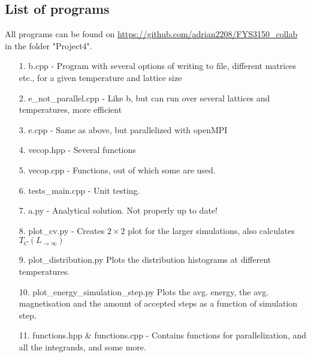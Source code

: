 \documentclass[10pt,a4paper]{article}
\begin{document}
\subsection{List of programs}
All programs can be found on \url{https://github.com/adrian2208/FYS3150_collab} in the folder "Project4".


\begin{itemize}
\item[1.] b.cpp - Program with several options of writing to file, different matrices etc., for a given temperature and lattice size
\item[2.] e\_not\_parallel.cpp - Like b, but can run over several lattices and temperatures, more efficient
\item[3.] e.cpp - Same as above, but parallelized with openMPI
\item[4.] vecop.hpp - Several functions
\item[5.] vecop.cpp - Functions, out of which some are used.
\item[6.] tests\_main.cpp - Unit testing.
\item[7.] a.py - Analytical solution. Not properly up to date!
\item[8.] plot\_cv.py - Creates $2\times2$ plot for the larger simulations, also calculates $T_C(L_{\rightarrow \infty})$
\item[9.] plot\_distribution.py Plots the distribution histograms at different temperatures.
\item[10.] plot\_energy\_simulation\_step.py Plots the  avg. energy, the avg. magnetisation and the amount of accepted steps as a function of simulation step.
\item[11.] functions.hpp \& functions.cpp - Contains functions for parallelization, and all the integrands, and some more.
\end{itemize}









\begin{comment}

$$
\begin{bmatrix}
0 & 0 & 0 & 0 \\
0 & 0 & 0 & 0 \\
0 & 0 & 0 & 0 \\
0 & 0 & 0 & 0 \\
\end{bmatrix}
$$

\begin{lstlisting}[caption=insert caption]
for (unsigned int i = 0; i<100;i++{
}
\end{lstlisting}

\begin{figure}[h]
\texttt{[image: ]}
\caption{include caption}
\end{figure}

\end{comment}
\end{document}
